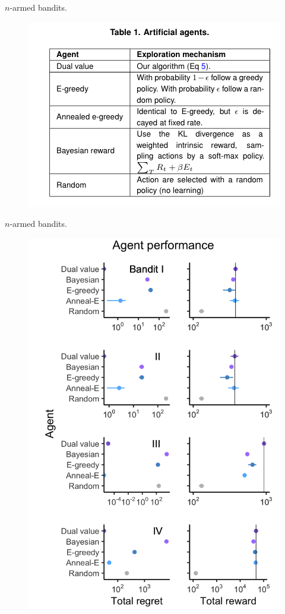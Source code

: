 \documentclass[10pt]{beamer}
\begin{document}
\begin{frame}[fragile]{$n$-armed bandits.}
\begin{figure}
    \centering
    \includegraphics[scale=0.8]{images/agents.png}
    \caption{}
\end{figure}
\end{frame}

\begin{frame}[fragile]{$n$-armed bandits.}
\begin{figure}
    \centering
    \includegraphics[scale=0.125]{images/fig3.png}
    \caption{}
\end{figure}
\end{frame}
\end{document}
